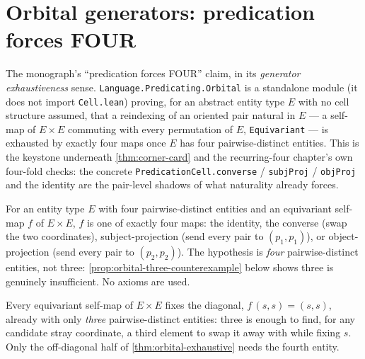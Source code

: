 \section{Orbital generators: predication forces FOUR}

The monograph's ``predication forces FOUR'' claim, in its \emph{generator
exhaustiveness} sense. \texttt{Language.Predicating.Orbital} is a standalone
module (it does not import \texttt{Cell.lean}) proving, for an abstract
entity type \(E\) with no cell structure assumed, that a reindexing of an
oriented pair natural in \(E\) --- a self-map of \(E \times E\) commuting
with every permutation of \(E\), \texttt{Equivariant} --- is exhausted by
exactly four maps once \(E\) has four pairwise-distinct entities. This is the
keystone underneath \cref{thm:corner-card} and the recurring-four chapter's
own four-fold checks: the concrete \texttt{PredicationCell.converse} /
\texttt{subjProj} / \texttt{objProj} and the identity are the pair-level
shadows of what naturality already forces.

\begin{theorem}\label{thm:orbital-exhaustive}\leanok{}
For an entity type \(E\) with four pairwise-distinct entities and an
equivariant self-map \(f\) of \(E \times E\), \(f\) is one of exactly four
maps: the identity, the converse (swap the two coordinates),
subject-projection (send every pair to \((p_1,p_1)\)), or object-projection
(send every pair to \((p_2,p_2)\)). The hypothesis is \emph{four}
pairwise-distinct entities, not three: \cref{prop:orbital-three-counterexample}
below shows three is genuinely insufficient. No axioms are used.
\end{theorem}

\begin{theorem}\label{thm:orbital-diagonal-fixed}\leanok{}
Every equivariant self-map of \(E \times E\) fixes the diagonal,
\(f\,(s,s) = (s,s)\), already with only \emph{three} pairwise-distinct
entities: three is enough to find, for any candidate stray coordinate, a
third element to swap it away with while fixing \(s\). Only the off-diagonal
half of \cref{thm:orbital-exhaustive} needs the fourth entity.
\end{theorem}

